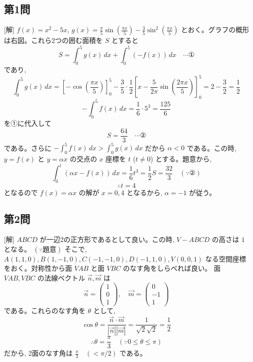 \documentclass[../main.tex]{subfiles}
\begin{document}
\subsection*{第1問}

[解] $f(x) = x^2 - 5x$, $g(x) = \frac{\pi}{5} \sin\left(\frac{\pi x}{5}\right) - \frac{3}{5} \sin^2\left(\frac{\pi x}{5}\right)$ とおく。グラフの概形は右図。これら2つの囲む面積を $S$ とすると
\[
  S = \int_0^5 g(x) \, dx + \int_0^5 (-f(x)) \, dx \quad \cdots \text{①}
\]
であり,
\[
  \int_0^5 g(x) \, dx = \left[ -\cos\left(\frac{\pi x}{5}\right) \right]_0^5 - \frac{3}{5} \cdot \frac{1}{2} \left[ x - \frac{5}{2\pi} \sin\left(\frac{2\pi x}{5}\right) \right]_0^5 = 2 - \frac{3}{2} = \frac{1}{2}
\]
\[
  -\int_0^5 f(x) \, dx = \frac{1}{6} \cdot 5^3 = \frac{125}{6}
\]
を①に代入して
\[
  S = \frac{64}{3} \quad \cdots \text{②}
\]
である。さらに $-\int_0^5 f(x) \, dx > \int_0^5 g(x) \, dx$ だから $\alpha < 0$ である。この時, $y=f(x)$ と $y=\alpha x$ の交点の $x$ 座標を $t$ ($t \neq 0$) とする。題意から,
\[
  \int_0^t (\alpha x - f(x)) \, dx = \frac{1}{6} t^3 = \frac{1}{2} S = \frac{32}{3} \quad (\because \text{②})
\]
\[
  \therefore t = 4
\]
となるので $f(x) = \alpha x$ の解が $x = 0, 4$ となるから, $\alpha = -1$ が従う。

\begin{center}
\end{center}

\subsection*{第2問}

[解] $ABCD$ が一辺2の正方形であるとして良い。この時, $V-ABCD$ の高さは $1$ となる。 $(\because \text{題意})$
そこで, $A(1,1,0), B(1,-1,0), C(-1,-1,0), D(-1,1,0), V(0,0,1)$ なる空間座標をおく。対称性から面 $VAB$ と面 $VBC$ のなす角をしらべれば良い。
面 $VAB, VBC$ の法線ベクトル $\vec{n}, \vec{m}$ は
\[
  \vec{n} =
  \begin{pmatrix} 1 \\ 0 \\ 1
  \end{pmatrix}, \quad \vec{m} =
  \begin{pmatrix} 0 \\ -1 \\ 1
  \end{pmatrix}
\]
である。これらのなす角を $\theta$ として,
\[
  \cos\theta = \frac{\vec{n} \cdot \vec{m}}{|\vec{n}||\vec{m}|} = \frac{1}{\sqrt{2}\sqrt{2}} = \frac{1}{2}
\]
\[
  \therefore \theta = \frac{\pi}{3} \quad (\because 0 \le \theta \le \pi)
\]
だから, 2面のなす角は $\frac{\pi}{3} \quad (<\pi/2)$ である。
\end{document}
